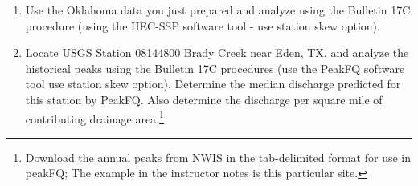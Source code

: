 \documentclass[12pt]{article}
\begin{document}
\begin{enumerate}
Use the data to:
\begin{enumerate}
\item Plot year versus stage ( x-axis is year).
\item Plot year versus discharge ( x-axis is year).
\item Plot the discharge versus stage.
\item Using the Weibull plotting position formula, determine the distribution parameters that fit the data for a log-normal distribution.
\item Using the Weibull plotting position formula, determine the distribution parameters that fit the data for a Gumbell distribution.
\item Using the Weibull plotting position formula, determine the distribution parameters that fit the data for a Gamma distribution.
\item Estimate the discharge associated with a 25-percent chance exceedence probability (i.e. the value that is equal to or exceeded with a 1 in 4 chance).
\item A resident claims that in the early 1900?s a flood corresponding to a stage of 30 feet occurred at the gage location.  Estimate the exceedence probability (return period) of the flow associated with this event.
\end{enumerate}
\clearpage

\item Use the Oklahoma data you just prepared and analyze using the Bulletin 17C procedure (using the HEC-SSP software tool - use station skew option).

\item  Locate USGS Station 08144800 Brady Creek near Eden, TX. and analyze the historical peaks using the Bulletin 17C procedures (use the PeakFQ software tool use station skew option).  Determine the median discharge predicted for this station by PeakFQ.  Also determine the discharge per square mile of contributing drainage area.\footnote{Download the annual peaks from NWIS in the tab-delimited format for use in peakFQ; The example in the instructor notes is this particular site.}

\end{enumerate}

\clearpage
\end{document}
